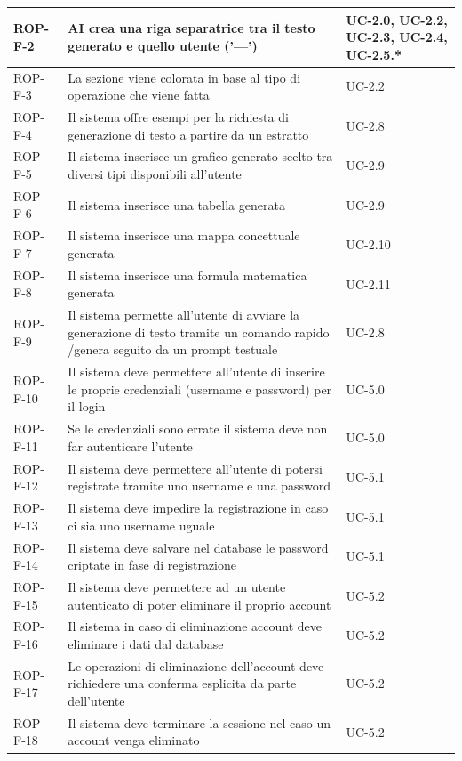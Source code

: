 \documentclass[11pt,a4paper]{article}
\begin{document}
\begin{longtable}{|p{}|>{\raggedright\arraybackslash}p{}|p{}|}
\hline
ROP-F-2 & AI crea una riga separatrice tra il testo generato e quello utente ('---') & UC-2.0, UC-2.2, UC-2.3, UC-2.4, UC-2.5.* \\
\hline
ROP-F-3 & La sezione viene colorata in base al tipo di operazione che viene fatta & UC-2.2 \\
\hline
ROP-F-4 & Il sistema offre esempi per la richiesta di generazione di testo a partire da un estratto & UC-2.8 \\
\hline
ROP-F-5 & Il sistema inserisce un grafico generato scelto tra diversi tipi disponibili all'utente & UC-2.9 \\
\hline
ROP-F-6 & Il sistema inserisce una tabella generata & UC-2.9 \\
\hline
ROP-F-7 & Il sistema inserisce una mappa concettuale generata & UC-2.10 \\
\hline
ROP-F-8 & Il sistema inserisce una formula matematica generata & UC-2.11 \\
\hline
ROP-F-9 & Il sistema permette all'utente di avviare la generazione di testo tramite un comando rapido /genera seguito da un prompt testuale & UC-2.8 \\
\hline
ROP-F-10 & Il sistema deve permettere all'utente di inserire le proprie credenziali (username e password) per il login & UC-5.0 \\
\hline
ROP-F-11 & Se le credenziali sono errate il sistema deve non far autenticare l'utente & UC-5.0 \\
\hline
ROP-F-12 & Il sistema deve permettere all'utente di potersi registrate tramite uno username e una password & UC-5.1 \\
\hline
ROP-F-13 & Il sistema deve impedire la registrazione in caso ci sia uno username uguale & UC-5.1 \\
\hline
ROP-F-14 & Il sistema deve salvare nel database le password criptate in fase di registrazione & UC-5.1 \\
\hline
ROP-F-15 & Il sistema deve permettere ad un utente autenticato di poter eliminare il proprio account & UC-5.2 \\
\hline
ROP-F-16 & Il sistema in caso di eliminazione account deve eliminare i dati dal database & UC-5.2 \\
\hline
ROP-F-17 & Le operazioni di eliminazione dell'account deve richiedere una conferma esplicita da parte dell'utente & UC-5.2 \\
\hline
ROP-F-18 & Il sistema deve terminare la sessione nel caso un account venga eliminato & UC-5.2 \\

\end{longtable}
\end{document}
